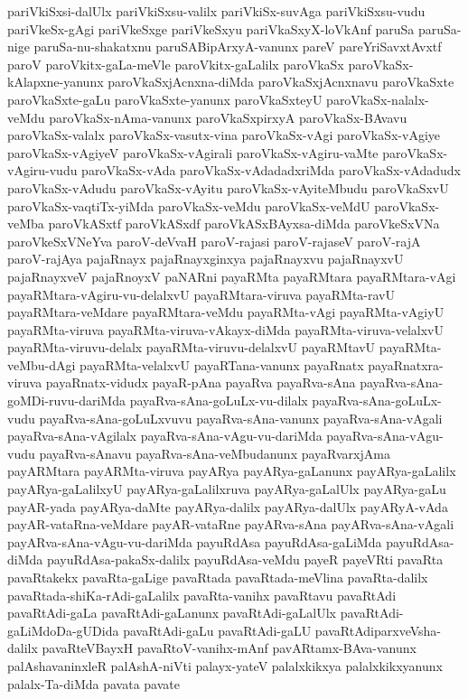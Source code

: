 {pariVkiSxsi-dalUlx
pariVkiSxsu-valilx
pariVkiSx-suvAga
pariVkiSxsu-vudu
pariVkeSx-gAgi
pariVkeSxge
pariVkeSxyu
pariVkaSxyX-loVkAnf
paruSa
paruSa-nige
paruSa-nu-shakatxnu
paruSABipArxyA-vanunx
pareV
pareYriSavxtAvxtf
paroV
paroVkitx-gaLa-meVle
paroVkitx-gaLalilx
paroVkaSx
paroVkaSx-kAlapxne-yanunx
paroVkaSxjAcnxna-diMda
paroVkaSxjAcnxnavu
paroVkaSxte
paroVkaSxte-gaLu
paroVkaSxte-yanunx
paroVkaSxteyU
paroVkaSx-nalalx-veMdu
paroVkaSx-nAma-vanunx
paroVkaSxpirxyA
paroVkaSx-BAvavu
paroVkaSx-valalx
paroVkaSx-vasutx-vina
paroVkaSx-vAgi
paroVkaSx-vAgiye
paroVkaSx-vAgiyeV
paroVkaSx-vAgirali
paroVkaSx-vAgiru-vaMte
paroVkaSx-vAgiru-vudu
paroVkaSx-vAda
paroVkaSx-vAdadadxriMda
paroVkaSx-vAdadudx
paroVkaSx-vAdudu
paroVkaSx-vAyitu
paroVkaSx-vAyiteMbudu
paroVkaSxvU
paroVkaSx-vaqtiTx-yiMda
paroVkaSx-veMdu
paroVkaSx-veMdU
paroVkaSx-veMba
paroVkASxtf
paroVkASxdf
paroVkASxBAyxsa-diMda
paroVkeSxVNa
paroVkeSxVNeYva
paroV-deVvaH
paroV-rajasi
paroV-rajaseV
paroV-rajA
paroV-rajAya
pajaRnayx
pajaRnayxginxya
pajaRnayxvu
pajaRnayxvU
pajaRnayxveV
pajaRnoyxV
paNARni
payaRMta
payaRMtara
payaRMtara-vAgi
payaRMtara-vAgiru-vu-delalxvU
payaRMtara-viruva
payaRMta-ravU
payaRMtara-veMdare
payaRMtara-veMdu
payaRMta-vAgi
payaRMta-vAgiyU
payaRMta-viruva
payaRMta-viruva-vAkayx-diMda
payaRMta-viruva-velalxvU
payaRMta-viruvu-delalx
payaRMta-viruvu-delalxvU
payaRMtavU
payaRMta-veMbu-dAgi
payaRMta-velalxvU
payaRTana-vanunx
payaRnatx
payaRnatxra-viruva
payaRnatx-vidudx
payaR-pAna
payaRva
payaRva-sAna
payaRva-sAna-goMDi-ruvu-dariMda
payaRva-sAna-goLuLx-vu-dilalx
payaRva-sAna-goLuLx-vudu
payaRva-sAna-goLuLxvuvu
payaRva-sAna-vanunx
payaRva-sAna-vAgali
payaRva-sAna-vAgilalx
payaRva-sAna-vAgu-vu-dariMda
payaRva-sAna-vAgu-vudu
payaRva-sAnavu
payaRva-sAna-veMbudanunx
payaRvarxjAma
payARMtara
payARMta-viruva
payARya
payARya-gaLanunx
payARya-gaLalilx
payARya-gaLalilxyU
payARya-gaLalilxruva
payARya-gaLalUlx
payARya-gaLu
payAR-yada
payARya-daMte
payARya-dalilx
payARya-dalUlx
payARyA-vAda
payAR-vataRna-veMdare
payAR-vataRne
payARva-sAna
payARva-sAna-vAgali
payARva-sAna-vAgu-vu-dariMda
payuRdAsa
payuRdAsa-gaLiMda
payuRdAsa-diMda
payuRdAsa-pakaSx-dalilx
payuRdAsa-veMdu
payeR
payeVRti
pavaRta
pavaRtakekx
pavaRta-gaLige
pavaRtada
pavaRtada-meVlina
pavaRta-dalilx
pavaRtada-shiKa-rAdi-gaLalilx
pavaRta-vanihx
pavaRtavu
pavaRtAdi
pavaRtAdi-gaLa
pavaRtAdi-gaLanunx
pavaRtAdi-gaLalUlx
pavaRtAdi-gaLiMdoDa-gUDida
pavaRtAdi-gaLu
pavaRtAdi-gaLU
pavaRtAdiparxveVsha-dalilx
pavaRteVBayxH
pavaRtoV-vanihx-mAnf
pavARtamx-BAva-vanunx
palAshavaninxleR
palAshA-niVti
palayx-yateV
palalxkikxya
palalxkikxyanunx
palalx-Ta-diMda
pavata
pavate
}
